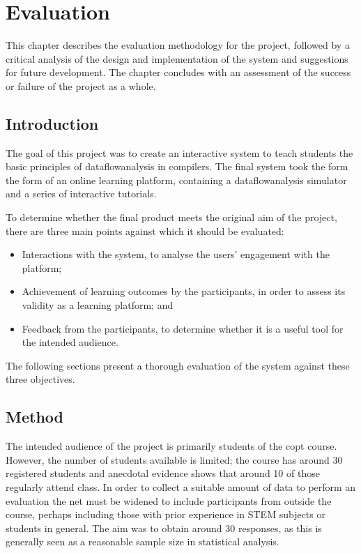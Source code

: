 \documentclass[bsc,twoside,singlespacing,parskip,logo,notimes,normalheadings]{infthesis}
\begin{document}
\chapter{Evaluation}
This chapter describes the evaluation methodology for the project,
followed by a critical analysis of the design and implementation of
the system and suggestions for future development. The chapter
concludes with an assessment of the success or failure of the project
as a whole.

    \section{Introduction}
    The goal of this project was to create an interactive system to
    teach students the basic principles of \gls{dataflowanalysis} in
    compilers. The final system took the form the form of an online
    learning platform, containing a \gls{dataflowanalysis} simulator
    and a series of interactive tutorials.

    To determine whether the final product meets the original aim of
    the project, there are three main points against which it should
    be evaluated:

    \begin{itemize}
    \item Interactions with the system, to analyse the users'
      engagement with the platform;
    \item Achievement of learning outcomes by the participants, in
      order to assess its validity as a learning platform; and
    \item Feedback from the participants, to determine whether it is a
      useful tool for the intended audience.
    \end{itemize}

    The following sections present a thorough evaluation of the
    system against these three objectives.

    \section{Method}

    The intended audience of the project is primarily students of the
    \gls{copt} course. However, the number of students available is
    limited; the course has around 30 registered students and
    anecdotal evidence shows that around 10 of those regularly attend
    class. In order to collect a suitable amount of data to perform an
    evaluation the net must be widened to include participants from
    outside the course, perhaps including those with prior experience
    in STEM subjects or students in general. The aim was to obtain
    around 30 responses, as this is generally seen as a reasonable
    sample size in statistical analysis.
\end{document}
